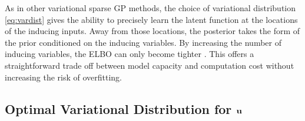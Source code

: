 \documentclass{article} %
\begin{document}
As in other variational sparse GP methods, the choice of variational distribution \eqref{eq:vardist} gives the ability to precisely learn the latent function at the locations of the inducing inputs. Away from those locations, the posterior takes the form of the prior conditioned on the inducing variables. By increasing the number of inducing variables, the ELBO can only become tighter \citep{Titsias2009}. This offers a straightforward trade off between model capacity and computation cost without increasing the risk of overfitting.




\subsection{Optimal Variational Distribution for ${\bf u}$}
\label{sec:optqu}

\end{document}
